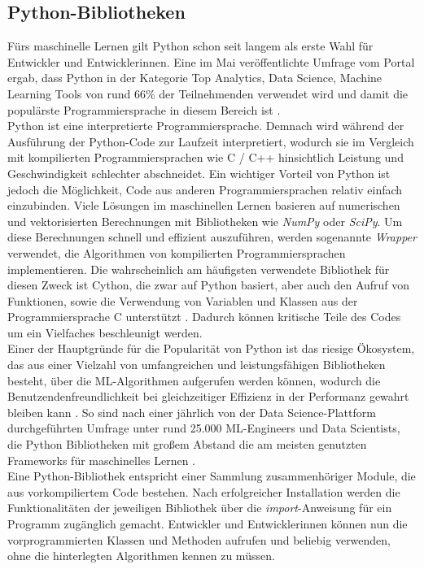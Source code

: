 \documentclass[german,bachelor]{swsLeipzig}
\begin{document}
\subsection{Python-Bibliotheken}
Fürs maschinelle Lernen gilt Python schon seit langem als erste Wahl für Entwickler und Entwicklerinnen.
Eine im Mai \citeyear{nugget} veröffentlichte Umfrage vom Portal \citeauthor{nugget} ergab, dass Python in der Kategorie
\glqq Top Analytics, Data Science, Machine Learning Tools\grqq{} von rund 66\% der Teilnehmenden verwendet wird
und damit die populärste Programmiersprache in diesem Bereich ist \cite[]{nugget}. \\

Python ist eine interpretierte Programmiersprache.
Demnach wird während der Ausführung der Python-Code zur Laufzeit interpretiert, wodurch sie im Vergleich mit kompilierten
Programmiersprachen wie C / C++ hinsichtlich Leistung und Geschwindigkeit schlechter abschneidet.
Ein wichtiger Vorteil von Python ist jedoch die Möglichkeit, Code aus anderen Programmiersprachen relativ einfach einzubinden.
Viele Lösungen im maschinellen Lernen basieren auf numerischen und vektorisierten Berechnungen mit Bibliotheken
wie \textit{NumPy} oder \textit{SciPy}.
Um diese Berechnungen schnell und effizient auszuführen, werden sogenannte \textit{Wrapper} verwendet,
die Algorithmen von kompilierten Programmiersprachen implementieren.
Die wahrscheinlich am häufigsten verwendete Bibliothek für diesen Zweck ist Cython, die zwar auf Python basiert,
aber auch den Aufruf von Funktionen, sowie die Verwendung von Variablen und Klassen aus der Programmiersprache C unterstützt \cite[]{8757088}.
Dadurch können kritische Teile des Codes um ein Vielfaches beschleunigt werden. \\

Einer der Hauptgründe für die Popularität von Python ist das riesige Ökosystem, das aus einer Vielzahl
von umfangreichen und leistungsfähigen Bibliotheken besteht, über die ML-Algorithmen aufgerufen werden können,
wodurch die Benutzendenfreundlichkeit bei gleichzeitiger Effizienz in der Performanz gewahrt bleiben kann \cite[]{2020}.
So sind nach einer jährlich von der Data Science-Plattform \citeauthor{kaggle} durchgeführten Umfrage unter rund 25.000 ML-Engineers
und Data Scientists, die Python Bibliotheken mit großem Abstand die am meisten genutzten Frameworks für maschinelles Lernen \cite[]{kaggle}.\\

Eine Python-Bibliothek entspricht einer Sammlung zusammenhöriger Module, die aus vorkompiliertem Code bestehen.
Nach erfolgreicher Installation werden die Funktionalitäten der jeweiligen Bibliothek über die \textit{import}-Anweisung für ein Programm zugänglich
gemacht.
Entwickler und Entwicklerinnen können nun die vorprogrammierten Klassen und Methoden aufrufen und beliebig verwenden,
ohne die hinterlegten Algorithmen kennen zu müssen.
\end{document}
